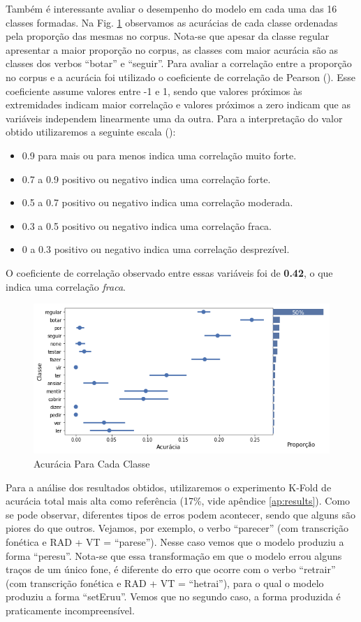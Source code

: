 Também é interessante avaliar o desempenho do modelo em cada uma das 16 classes formadas. Na Fig. \ref{fig:kfoldprop} observamos as acurácias de cada classe ordenadas pela proporção das mesmas no corpus. Nota-se que apesar da classe regular apresentar a maior proporção no corpus, as classes com maior acurácia são as classes dos verbos “botar” e “seguir”. Para avaliar a correlação entre a proporção no corpus e a acurácia foi utilizado o coeficiente de correlação de Pearson (\cite{2004:bussab}). Esse coeficiente assume valores entre -1 e 1, sendo que valores próximos às extremidades indicam maior correlação e valores próximos a zero indicam que as variáveis independem linearmente uma da outra. Para a interpretação do valor obtido utilizaremos a seguinte escala (\cite{pearson:1989}):

\begin{itemize}
    \item 0.9 para mais ou para menos indica uma correlação muito forte.
    \item0.7 a 0.9 positivo ou negativo indica uma correlação forte.
    \item0.5 a 0.7 positivo ou negativo indica uma correlação moderada.
    \item0.3 a 0.5 positivo ou negativo indica uma correlação fraca.
    \item0 a 0.3 positivo ou negativo indica uma correlação desprezível.
\end{itemize}

O coeficiente de correlação observado entre essas variáveis foi de \textbf{0.42}, o que indica uma correlação \textit{fraca}. 

\begin{figure}[H]
  \centering
  \includegraphics[width=0.8\linewidth]{img/proporxacc.png}
  \caption{Acurácia Para Cada Classe}
  \label{fig:kfoldprop}
\end{figure}

Para a análise dos resultados obtidos, utilizaremos o experimento K-Fold de acurácia total mais alta como referência (17\%, vide apêndice \ref{ap:results}). Como se pode observar, diferentes tipos de erros podem acontecer, sendo que alguns são piores do que outros. Vejamos, por exemplo, o verbo “parecer” (com transcrição fonética e RAD + VT = “parese”). Nesse caso vemos que o modelo produziu a forma “peresu”. Nota-se que essa transformação em que o modelo errou alguns traços de um único fone, é diferente do erro que ocorre com o verbo “retrair” (com transcrição fonética e RAD + VT = “hetrai”), para o qual o modelo produziu a forma “setEruu”. Vemos que no segundo caso, a forma produzida é praticamente incompreensível. %

